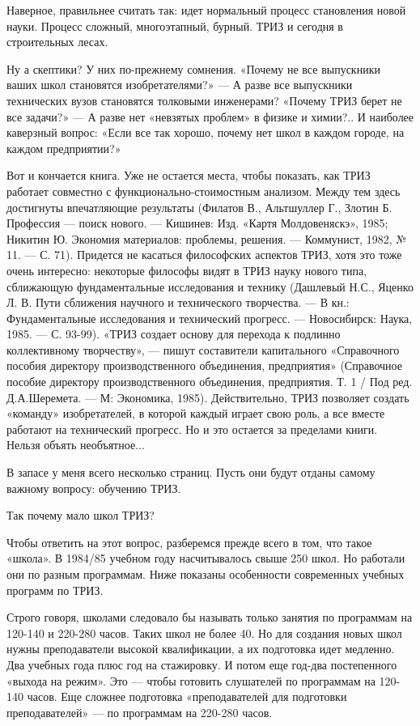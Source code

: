 Наверное, правильнее считать так:  идет нормальный процесс становления
новой науки. Процесс  сложный, многоэтапный, бурный. ТРИЗ  и сегодня в
строительных лесах.

Ну а скептики?  У них по-прежнему сомнения. «Почему  не все выпускники
ваших  школ  становятся  изобретателями?»  — А  разве  все  выпускники
технических вузов становятся толковыми  инженерами? «Почему ТРИЗ берет
не все задачи?» — А разве нет «невзятых проблем» в физике и химии?.. И
наиболее каверзный  вопрос: «Если  все так хорошо,  почему нет  школ в
каждом городе, на каждом предприятии?»


Вот  и  кончается  книга.  Уже  не  остается  места,  чтобы  показать,
как  ТРИЗ  работает  совместно с  функционально-стоимостным  анализом.
Между  тем  здесь  достигнуты  впечатляющие  результаты  (Филатов  В.,
Альтшуллер Г.,  Злотин Б.  Профессия — поиск  нового. —  Кишинев: Изд.
«Картя Молдовеняскэ», 1985; Никитин  Ю. Экономия материалов: проблемы,
решения.  — Коммунист,  1982, №  11. —  С. 71).  Придется не  касаться
философских аспектов  ТРИЗ, хотя  это тоже очень  интересно: некоторые
философы видят  в ТРИЗ  науку нового типа,  сближающую фундаментальные
исследования и  технику (Дашлевый  Н.С., Яценко  Л. В.  Пути сближения
научного  и   технического  творчества.   —  В   кн.:  Фундаментальные
исследования и технический прогресс. —  Новосибирск: Наука, 1985. — С.
93-99).  «ТРИЗ создает  основу для  перехода к  подлинно коллективному
творчеству»,  — пишут  составители  капитального «Справочного  пособия
директору  производственного   объединения,  предприятия»  (Справочное
пособие директору  производственного объединения, предприятия. Т.  1 /
Под  ред. Д.А.Шеремета.  —  М: Экономика,  1985). Действительно,  ТРИЗ
позволяет  создать «команду»  изобретателей, в  которой каждый  играет
свою роль,  а все вместе  работают на  технический прогресс. Но  и это
остается за пределами книги. Нельзя объять необъятное...

В запасе у меня всего несколько страниц. Пусть они будут отданы самому
важному вопросу: обучению ТРИЗ.


Так почему мало школ ТРИЗ?

Чтобы  ответить на  этот вопрос,  разберемся прежде  всего в  том, что
такое «школа».  В 1984/85 учебном  году насчитывалось свыше  250 школ.
Но  работали  они  по  разным программам.  Ниже  показаны  особенности
современных учебных программ по ТРИЗ.


Строго  говоря,  школами  следовало  бы  называть  только  занятия  по
программам на 120-140 и 220-280 часов.  Таких школ не более 40. Но для
создания  новых школ  нужны преподаватели  высокой квалификации,  а их
подготовка идет медленно.  Два учебных года плюс год  на стажировку. И
потом еще год-два постепенного «выхода на режим». Это — чтобы готовить
слушателей  по программам  на  120-140 часов.  Еще сложнее  подготовка
«преподавателей  для подготовки  преподавателей»  —  по программам  на
220-280 часов.

